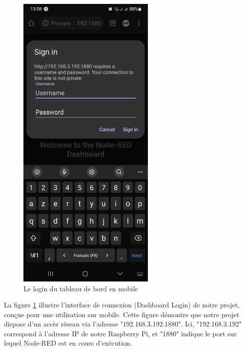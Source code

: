 \begin{figure}[H]
\centering
\includegraphics[height=15cm]{Images/1006591.jpg}
\caption{Le login du tableau de bord en mobile}
\label{Chap4.3.22}
\end{figure}

La figure \ref{Chap4.3.22} illustre l'interface de connexion (Dashboard Login) de notre projet, conçue pour une utilisation sur mobile. Cette figure démontre que notre projet dispose d'un accès réseau via l'adresse "192.168.3.192:1880". Ici, "192.168.3.192" correspond à l'adresse IP de notre Raspberry Pi, et "1880" indique le port sur lequel Node-RED est en cours d'exécution.

